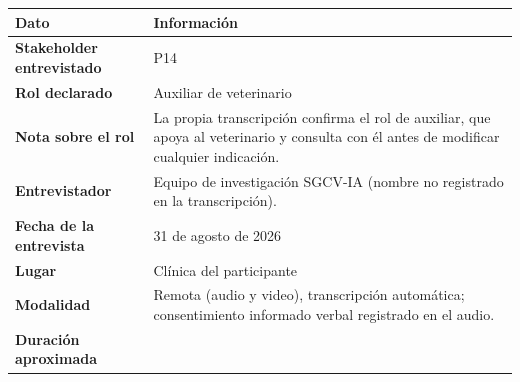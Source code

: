 \documentclass[
]{article}
\newcounter{none} %
\begin{document}
{\def\LTcaptype{none} %
\begin{longtable}[]{|
  >{\raggedright\arraybackslash}p{}|
  >{\raggedright\arraybackslash}p{}|}
\hline
\begin{minipage}[b]{\linewidth}\centering
\textbf{Dato}
\end{minipage} & \begin{minipage}[b]{\linewidth}\centering
\textbf{Información}
\end{minipage} \\
\hline
\endhead
\hline
\endlastfoot
\textbf{Stakeholder entrevistado} & \begin{minipage}[t]{\linewidth}\raggedright
P14
\end{minipage} \\
\hline
\textbf{Rol declarado} & \begin{minipage}[t]{\linewidth}\raggedright
Auxiliar de veterinario
\end{minipage} \\
\hline
\textbf{Nota sobre el rol} & \begin{minipage}[t]{\linewidth}\raggedright
La propia transcripción confirma el rol de auxiliar, que apoya al veterinario y consulta con él antes de modificar cualquier indicación.
\end{minipage} \\
\hline
\textbf{Entrevistador} & \begin{minipage}[t]{\linewidth}\raggedright
Equipo de investigación SGCV-IA (nombre no registrado en la transcripción).
\end{minipage} \\
\hline
\textbf{Fecha de la entrevista} & \begin{minipage}[t]{\linewidth}\raggedright
31 de agosto de 2026
\end{minipage} \\
\hline
\textbf{Lugar} & \begin{minipage}[t]{\linewidth}\raggedright
Clínica del participante
\end{minipage} \\
\hline
\textbf{Modalidad} & \begin{minipage}[t]{\linewidth}\raggedright
Remota (audio y video), transcripción automática; consentimiento informado verbal registrado en el audio.
\end{minipage} \\
\hline
\textbf{Duración aproximada} & \begin{minipage}[t]{\linewidth}\raggedright

\end{minipage}
\end{longtable}}
\end{document}
